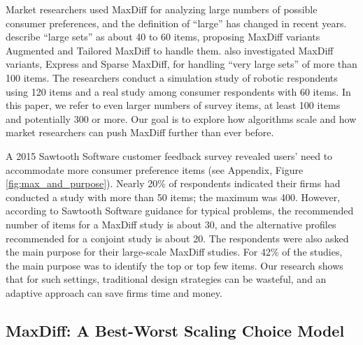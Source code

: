 \documentclass[a4paper,11pt]{article}
\begin{document}
Market researchers used MaxDiff for analyzing large numbers of possible consumer preferences, and the definition of ``large'' has changed in recent years. \cite{hendrix2007alternative} describe ``large sets'' as about 40 to 60 items, proposing MaxDiff variants Augmented and Tailored MaxDiff to handle them. \cite{wirth2012largeset} also investigated MaxDiff variants, Express and Sparse MaxDiff, for handling ``very large sets'' of more than 100 items. The researchers conduct a simulation study of robotic respondents using 120 items and a real study among consumer respondents with 60 items. In this paper, we refer to even larger numbers of survey items, at least 100 items and potentially 300 or more. Our goal is to explore how algorithms scale and how market researchers can push MaxDiff further than ever before.

A 2015 Sawtooth Software customer feedback survey revealed users' need to accommodate more consumer preference items (see Appendix, Figure \ref{fig:max_and_purpose}). Nearly 20\% of respondents indicated their firms had conducted a study with more than 50 items; the maximum was 400. However, according to Sawtooth Software guidance for typical problems, the recommended number of items for a MaxDiff study is about 30, and the alternative profiles recommended for a conjoint study is about 20. The respondents were also asked the main purpose for their large-scale MaxDiff studies. For 42\% of the studies, the main purpose was to identify the top or top few items. Our research shows that for such settings, traditional design strategies can be wasteful, and an adaptive approach can save firms time and money.





\subsection{MaxDiff: A Best-Worst Scaling Choice Model}
\end{document}
